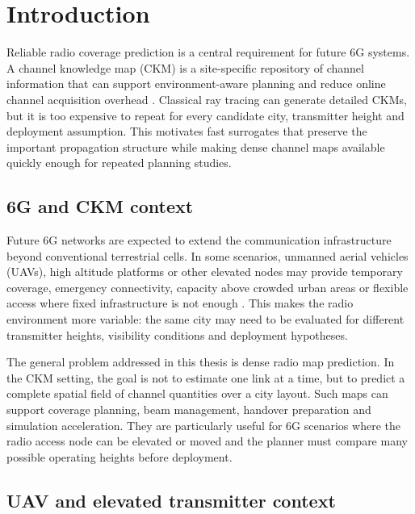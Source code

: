 \chapter{Introduction}
\label{chap:introduction}

Reliable radio coverage prediction is a central requirement for future 6G
systems. A channel knowledge map (CKM) is a site-specific repository of channel
information that can support environment-aware planning and reduce online
channel acquisition overhead \cite{zengx2021ckm,ckmtutorial2024}. Classical ray
tracing can generate detailed CKMs, but it is too expensive to repeat for every
candidate city, transmitter height and deployment assumption. This motivates
fast surrogates that preserve the important propagation structure while making
dense channel maps available quickly enough for repeated planning studies.

\section{6G and CKM context}

Future 6G networks are expected to extend the communication infrastructure
beyond conventional terrestrial cells. In some scenarios, unmanned aerial
vehicles (UAVs), high altitude platforms or other elevated nodes may provide
temporary coverage, emergency connectivity, capacity above crowded urban areas
or flexible access where fixed infrastructure is not enough
\cite{khawaja_survey,threegpp22125,vinogradov2018uavtutorial}. This makes the
radio environment more variable: the same city may need to be evaluated for
different transmitter heights, visibility conditions and deployment hypotheses.

The general problem addressed in this thesis is dense radio map prediction. In
the CKM setting, the goal is not to estimate one link at a time, but to predict
a complete spatial field of channel quantities over a city layout. Such maps
can support coverage planning, beam management, handover preparation and
simulation acceleration. They are particularly useful for 6G scenarios where
the radio access node can be elevated or moved and the planner must compare
many possible operating heights before deployment.

\section{UAV and elevated transmitter context}


